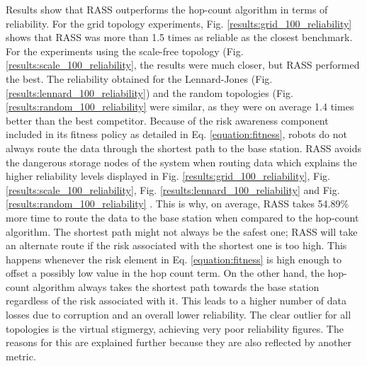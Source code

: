 Results show that \ac{RASS} outperforms the hop-count algorithm in terms of reliability. For the grid topology experiments, Fig. \ref{results:grid_100_reliability} shows that \ac{RASS} was more than 1.5 times as reliable as the closest benchmark. For the experiments using the scale-free topology (Fig. \ref{results:scale_100_reliability}, the results were much closer, but \ac{RASS} performed the best. The reliability obtained for the Lennard-Jones (Fig. \ref{results:lennard_100_reliability}) and the random topologies (Fig. \ref{results:random_100_reliability} were similar, as they were on average 1.4 times better than the best competitor. Because of the risk awareness component included in its fitness policy as detailed in Eq. \ref{equation:fitness}, robots do not always route the data through the shortest path to the base station. \ac{RASS} avoids the dangerous storage nodes of the system when routing data which explains the higher reliability levels displayed in Fig. \ref{results:grid_100_reliability}, Fig. \ref{results:scale_100_reliability}, Fig. \ref{results:lennard_100_reliability} and Fig. \ref{results:random_100_reliability} . This is why, on average, \ac{RASS} takes 54.89\% more time to route the data to the base station when compared to the hop-count algorithm. The shortest path might not always be the safest one; \ac{RASS} will take an alternate route if the risk associated with the shortest one is too high. This happens whenever the risk element in Eq. \ref{equation:fitness} is high enough to offset a possibly low value in the hop count term. On the other hand, the hop-count algorithm always takes the shortest path towards the base station regardless of the risk associated with it. This leads to a higher number of data losses due to corruption and an overall lower reliability. The clear outlier for all topologies is the virtual stigmergy, achieving very poor reliability figures. The reasons for this are explained further because they are also reflected by another metric.

